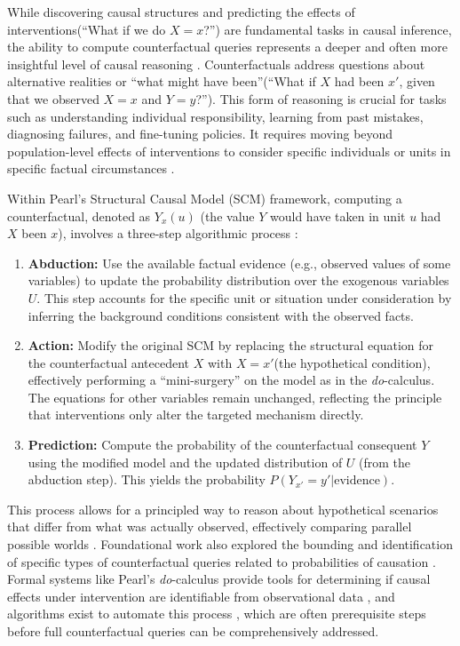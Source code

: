 {While discovering causal structures and predicting the effects of interventions(``What if we do $X=x$?'') are fundamental tasks in causal inference, the ability to compute counterfactual queries represents a deeper and often more insightful level of causal reasoning \cite{Pearl2009Causality}. Counterfactuals address questions about alternative realities or ``what might have been''(``What if $X$ had been $x'$, given that we observed $X=x$ and $Y=y$?''). This form of reasoning is crucial for tasks such as understanding individual responsibility, learning from past mistakes, diagnosing failures, and fine-tuning policies. It requires moving beyond population-level effects of interventions to consider specific individuals or units in specific factual circumstances \cite{Pearl2009Causality, Balke1994Probabilistic}.

Within Pearl's Structural Causal Model (SCM) framework, computing a counterfactual, denoted as $Y_x(u)$ (the value $Y$ would have taken in unit $u$ had $X$ been $x$), involves a three-step algorithmic process \cite{Pearl2009Causality}:
\begin{enumerate}
    \item \textbf{Abduction:} Use the available factual evidence (e.g., observed values of some variables) to update the probability distribution over the exogenous variables $U$. This step accounts for the specific unit or situation under consideration by inferring the background conditions consistent with the observed facts.
    \item \textbf{Action:} Modify the original SCM by replacing the structural equation for the counterfactual antecedent $X$ with $X=x'$(the hypothetical condition), effectively performing a ``mini-surgery'' on the model as in the \textit{do}-calculus. The equations for other variables remain unchanged, reflecting the principle that interventions only alter the targeted mechanism directly.
    \item \textbf{Prediction:} Compute the probability of the counterfactual consequent $Y$ using the modified model and the updated distribution of $U$ (from the abduction step). This yields the probability $P(Y_{x'} = y' | \text{evidence})$.
\end{enumerate}

This process allows for a principled way to reason about hypothetical scenarios that differ from what was actually observed, effectively comparing parallel possible worlds \cite{Pearl2009Causality, Morgan2015Counterfactuals}. Foundational work also explored the bounding and identification of specific types of counterfactual queries related to probabilities of causation \cite{tian2000probabilities}. Formal systems like Pearl's \textit{do}-calculus provide tools for determining if causal effects under intervention are identifiable from observational data \cite{tian2002identification}, and algorithms exist to automate this process \cite{shpitser2012efficient}, which are often prerequisite steps before full counterfactual queries can be comprehensively addressed.

}

